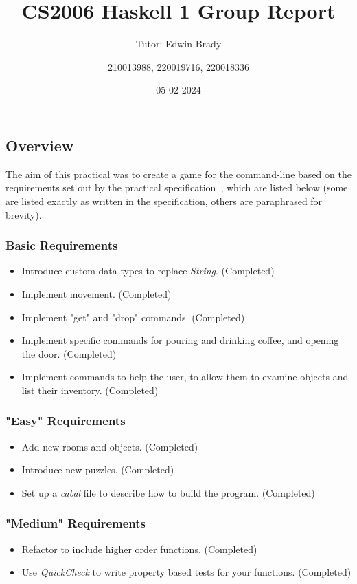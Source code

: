 \documentclass[a4paper,]{article}
\title{CS2006 Haskell 1 Group Report}
\subtitle{Tutor: Edwin Brady}
\author{210013988, 220019716, 220018336}
\date{05-02-2024}
\providecommand{\tightlist}{%
  \setlength{\itemsep}{0pt}\setlength{\parskip}{0pt}}
\begin{document}
\maketitle

\hypertarget{overview}{%
\subsection{Overview}\label{overview}}

The aim of this practical was to create a game for the command-line based on the requirements set out by the practical specification~\cite{practical-specification}, which are listed below (some are listed exactly as written in the specification, others are paraphrased for brevity).

\subsubsection{Basic Requirements}
\begin{itemize}
\tightlist
\item
  Introduce custom data types to replace \textit{String}. (Completed)
\item
  Implement movement. (Completed)
\item
  Implement "get" and "drop" commands. (Completed)
\item 
  Implement specific commands for pouring and drinking coffee, and opening the door. (Completed)
\item 
  Implement commands to help the user, to allow them to examine objects and list their inventory. (Completed)
\end{itemize}

\subsubsection{"Easy" Requirements}
\begin{itemize}
\tightlist
\item
  Add new rooms and objects. (Completed)
\item
  Introduce new puzzles. (Completed)
\item
  Set up a \textit{cabal} file to describe how to build the program. (Completed)
\end{itemize}

\subsubsection{"Medium" Requirements}
\begin{itemize}
\tightlist
\item
  Refactor to include higher order functions. (Completed)
\item
  Use \textit{QuickCheck} to write property based tests for your functions. (Completed)
\end{itemize}
\end{document}
